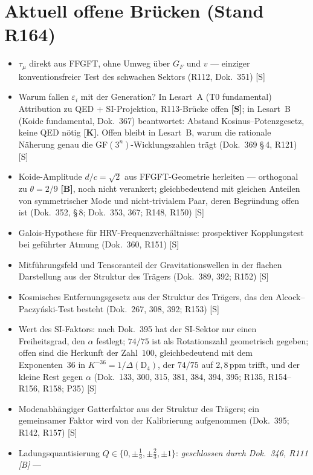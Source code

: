 \section{Aktuell offene Br\"ucken (Stand R164)}

\begin{itemize}\itemsep2pt
  \item $\tau_\mu$ direkt aus FFGFT, ohne Umweg über $G_F$ und $v$ --- einziger konventionsfreier Test des schwachen Sektors (R112, Dok.~351) [S]
  \item Warum fallen $\varepsilon_i$ mit der Generation? In Lesart~A (T0 fundamental) Attribution zu QED + SI-Projektion, R113-Brücke offen \textbf{[S]}; in Lesart~B (Koide fundamental, Dok.~367) beantwortet: Abstand Kosinus--Potenzgesetz, keine QED nötig \textbf{[K]}. Offen bleibt in Lesart~B, warum die rationale Näherung genau die GF$(3^n)$-Wicklungszahlen trägt (Dok.~369 §\,4, R121) [S]
  \item Koide-Amplitude $d/c=\sqrt{2}$ aus FFGFT-Geometrie herleiten --- orthogonal zu $\theta=2/9$ \textbf{[B]}, noch nicht verankert; gleichbedeutend mit gleichen Anteilen von symmetrischer Mode und nicht-trivialem Paar, deren Begründung offen ist (Dok.~352, §\,8; Dok.~353, 367; R148, R150) [S]
  \item Galois-Hypothese für HRV-Frequenzverhältnisse: prospektiver Kopplungstest bei geführter Atmung (Dok.~360, R151) [S]
  \item Mitführungsfeld und Tensoranteil der Gravitationswellen in der flachen Darstellung aus der Struktur des Trägers (Dok.~389, 392; R152) [S]
  \item Kosmisches Entfernungsgesetz aus der Struktur des Trägers, das den Alcock--Paczyński-Test besteht (Dok.~267, 308, 392; R153) [S]
  \item Wert des SI-Faktors: nach Dok.~395 hat der SI-Sektor nur einen Freiheitsgrad, den $\alpha$ festlegt; $74/75$ ist als Rotationszahl geometrisch gegeben; offen sind die Herkunft der Zahl~$100$, gleichbedeutend mit dem Exponenten~36 in $K^{-36}=1/\Delta(\mathrm{D}_4)$, der $74/75$ auf $2{,}8$\,ppm trifft, und der kleine Rest gegen $\alpha$ (Dok.~133, 300, 315, 381, 384, 394, 395; R135, R154--R156, R158; P35) [S]
  \item Modenabhängiger Gatterfaktor aus der Struktur des Trägers; ein gemeinsamer Faktor wird von der Kalibrierung aufgenommen (Dok.~395; R142, R157) [S]
  \item Ladungsquantisierung $Q\in\{0,\pm\tfrac{1}{3},\pm\tfrac{2}{3},\pm1\}$: \emph{geschlossen durch Dok.~346, R111 [B]} ---

\end{itemize}
